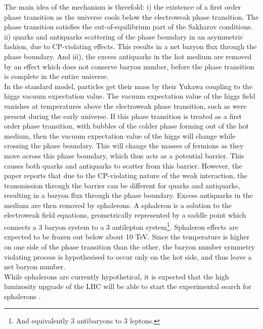The main idea of the mechanism is threefold: i) the existence of a first order phase transition as the universe cools below the electroweak phase transition. The phase transition satisfies the out-of-equilibrium part of the Sakharov conditions. ii) quarks and antiquarks scattering of the phase boundary in an asymmetric fashion, due to CP-violating effects. This results in a net baryon flux through the phase boundary. And iii), the excess antiquarks in the hot medium are removed by an effect which does not conserve baryon number, before the phase transition is complete in the entire universe. \\
In the standard model, particles get their mass by their Yukawa coupling to the higgs vacuum expectation value\cite{SANTAMARIA199390}. The vacuum expectation value of the higgs field vanishes at temperatures above the electroweak phase transition, such as were present during the early universe\cite{Higgs_vev_highT}. If this phase transition is treated as a first order phase transition, with bubbles of the colder phase forming out of the hot medium, then the vacuum expectation value of the higgs will change while crossing the phase boundary. This will change the masses of fermions as they move across this phase boundary, which thus acts as a potential barrier. This causes both quarks and antiquarks to scatter from this barrier. However, the paper reports that due to the CP-violating nature of the weak interaction, the transmission through the barrier can be different for quarks and antiquarks, resulting in a baryon flux through the phase boundary. Excess antiquarks in the medium are then removed by sphalerons. A sphaleron is a solution to the electroweak field equations, geometrically represented by a saddle point which connects a 3 baryon system to a 3 antilepton system\footnote{And equivalently 3 antibaryons to 3 leptons.}\cite{Phong_2020}. Sphaleron effects are expected to be frozen out below about 10 TeV. Since the temperature is higher on one side of the phase transition than the other, the baryon number symmetry violating process is hypothesised to occur only on the hot side, and thus leave a net baryon number.  \\

While sphalerons are currently hypothetical, it is expected that the high luminosity upgrade of the LHC will be able to start the experimental search for sphalerons \cite{Papaefstathiou_2019}.


